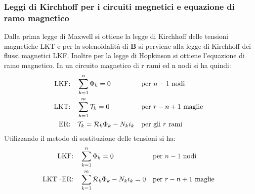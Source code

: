 \documentclass{article}
\begin{document}
\subsubsection{Leggi di Kirchhoff per i circuiti megnetici e equazione di ramo magnetico}
Dalla prima legge di Maxwell si ottiene la legge di Kirchhoff delle tensioni magnetiche LKT e per la solenoidalità di $\mathbf{B}$ si perviene alla legge di Kirchhoff dei flussi magnetici LKF. Inoltre per la legge di Hopkinson si ottiene l'equazione
di ramo magnetico. In un circuito magnetico di r rami ed n nodi si ha quindi:
\begin{align*}
    \text{LKF:}& 
    &
    &\sum_{k=1}^n \Phi_k = 0
    &
    &\text{per } n-1 \text{ nodi}
    \\
    \text{LKT:}& 
    &
    &\sum_{k=1}^m \mathcal{T}_k = 0
    &
    &\text{per } r-n+1 \text{ maglie}
    \\
    \text{ER:}& 
    &
    &\mathcal{T}_k = \mathcal{R}_k \Phi_k - N_ki_k
    &
    &\text{per gli } r \text{ rami}
\end{align*}
Utilizzando il metodo di sostituzione delle tensioni si ha:
\begin{align*}
    \text{LKF:}& 
    &
    &\sum_{k=1}^n \Phi_k = 0
    &
    &\text{per } n-1 \text{ nodi}
    \\
    \text{LKT -ER:}& 
    &
    &\sum_{k=1}^m  \mathcal{R}_k \Phi_k - N_ki_k = 0
    &
    &\text{per } r-n+1 \text{ maglie}
\end{align*}
\end{document}

